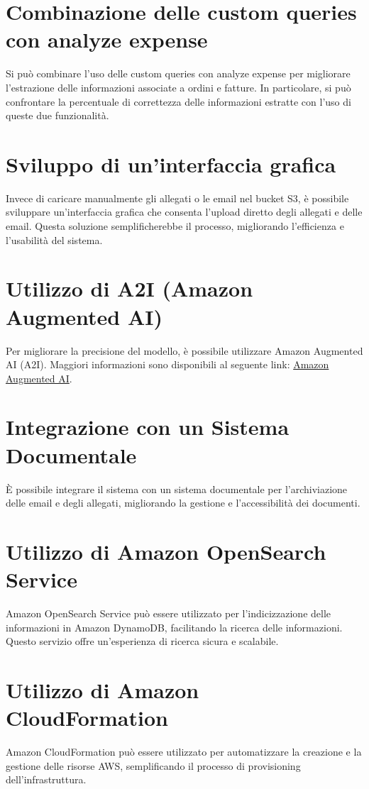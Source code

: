 \section{Combinazione delle custom queries con analyze expense}
Si può combinare l'uso delle custom queries con analyze expense per migliorare l'estrazione delle informazioni associate a ordini e fatture. In particolare, si può confrontare la percentuale di correttezza delle informazioni estratte con l'uso di queste due funzionalità.

\section{Sviluppo di un'interfaccia grafica}
Invece di caricare manualmente gli allegati o le email nel bucket S3, è possibile sviluppare un'interfaccia grafica che consenta l'upload diretto degli allegati e delle email. Questa soluzione semplificherebbe il processo, migliorando l'efficienza e l'usabilità del sistema.

\section{Utilizzo di A2I (Amazon Augmented AI)}

Per migliorare la precisione del modello, è possibile utilizzare Amazon Augmented AI (A2I). Maggiori informazioni sono disponibili al seguente link: \href{https://aws.amazon.com/it/augmented-ai/}{Amazon Augmented AI}.

\section{Integrazione con un Sistema Documentale}

È possibile integrare il sistema con un sistema documentale per l'archiviazione delle email e degli allegati, migliorando la gestione e l'accessibilità dei documenti.

\section{Utilizzo di Amazon OpenSearch Service}

Amazon OpenSearch Service può essere utilizzato per l'indicizzazione delle informazioni in Amazon DynamoDB, facilitando la ricerca delle informazioni. Questo servizio offre un'esperienza di ricerca sicura e scalabile.

\section{Utilizzo di Amazon CloudFormation}

Amazon CloudFormation può essere utilizzato per automatizzare la creazione e la gestione delle risorse AWS, semplificando il processo di provisioning dell'infrastruttura.